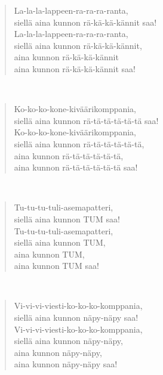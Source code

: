 \noindent\begin{minipage}{\linewidth}
\begin{verse}
	La-la-la-lappeen-ra-ra-ra-ranta,\\
	siellä aina kunnon rä-kä-kä-kännit saa!\\
	La-la-la-lappeen-ra-ra-ra-ranta,\\
	siellä aina kunnon rä-kä-kä-kännit,\\
	aina kunnon rä-kä-kä-kännit\\
	aina kunnon rä-kä-kä-kännit saa!\\
\end{verse}
\end{minipage}\\[10pt]
\noindent\begin{minipage}{\linewidth}
\begin{verse}
	Ko-ko-ko-kone-kiväärikomppania,\\
	siellä aina kunnon rä-tä-tä-tä-tä-tä saa!\\
	Ko-ko-ko-kone-kiväärikomppania,\\
	siellä aina kunnon rä-tä-tä-tä-tä-tä,\\
	aina kunnon rä-tä-tä-tä-tä-tä,\\
	aina kunnon rä-tä-tä-tä-tä-tä saa!\\
\end{verse}
\end{minipage}\\[10pt]
\noindent\begin{minipage}{\linewidth}
\begin{verse}
	Tu-tu-tu-tuli-asemapatteri,\\
	siellä aina kunnon TUM saa!\\
	Tu-tu-tu-tuli-asemapatteri,\\
	siellä aina kunnon TUM,\\
	aina kunnon TUM,\\
	aina kunnon TUM saa!\\
\end{verse}
\end{minipage}\\[10pt]
\noindent\begin{minipage}{\linewidth}
\begin{verse}
	Vi-vi-vi-viesti-ko-ko-ko-komppania,\\
	siellä aina kunnon näpy-näpy saa!\\
	Vi-vi-vi-viesti-ko-ko-ko-komppania,\\
	siellä aina kunnon näpy-näpy,\\
	aina kunnon näpy-näpy,\\
	aina kunnon näpy-näpy saa!\\
\end{verse}
\end{minipage}\\[10pt]
